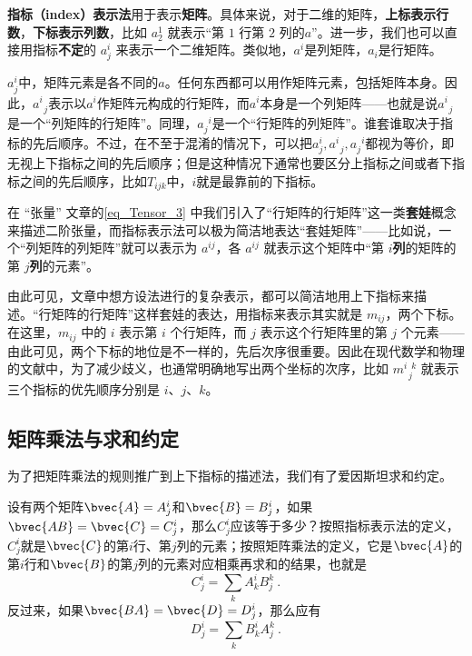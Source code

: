 \textbf{指标（index）表示法}用于表示\textbf{矩阵}。具体来说，对于二维的矩阵，\textbf{上标表示行数}，\textbf{下标表示列数}，比如 $a^1_2$ 就表示“第 $1$ 行第 $2$ 列的$a$”。进一步，我们也可以直接用指标\textbf{不定}的 $a^i_j$ 来表示一个二维矩阵。类似地，$a^i$是列矩阵，$a_i$是行矩阵。

$a^i_j$中，矩阵元素是各不同的$a$。任何东西都可以用作矩阵元素，包括矩阵本身。因此，$a^{i}_{\phantom{1}j}$表示以$a^i$作矩阵元构成的行矩阵，而$a^i$本身是一个列矩阵——也就是说$a^i_{\phantom{1}j}$是一个“列矩阵的行矩阵”。同理，$a^{\phantom{1}i}_j$是一个“行矩阵的列矩阵”。谁套谁取决于指标的先后顺序。不过，在不至于混淆的情况下，可以把$a^i_j, a^i_{\phantom{1}j}, a^{\phantom{1}i}_j$都视为等价，即无视上下指标之间的先后顺序；但是这种情况下通常也要区分上指标之间或者下指标之间的先后顺序，比如$T_{ijk}$中，$i$就是最靠前的下指标。

在 “张量” 文章的\autoref{eq_Tensor_3} 中我们引入了“行矩阵的行矩阵”这一类\textbf{套娃}概念来描述二阶张量，而指标表示法可以极为简洁地表达“套娃矩阵”——比如说，一个“列矩阵的列矩阵”就可以表示为 $a^{ij}$，各 $a^{ij}$ 就表示这个矩阵中“第 $i$\textbf{列}的矩阵的第 $j$\textbf{列}的元素”。

由此可见，文章中想方设法进行的复杂表示，都可以简洁地用上下指标来描述。“行矩阵的行矩阵”这样套娃的表达，用指标来表示其实就是 $m_{ij}$，两个下标。在这里，$m_{ij}$ 中的 $i$ 表示第 $i$ 个行矩阵，而 $j$ 表示这个行矩阵里的第 $j$ 个元素——由此可见，两个下标的地位是不一样的，先后次序很重要。因此在现代数学和物理的文献中，为了减少歧义，也通常明确地写出两个坐标的次序，比如 $m^{i\phantom{1}k}_{\phantom{1}j}$ 就表示三个指标的优先顺序分别是 $i$、$j$、$k$。




\subsection{矩阵乘法与求和约定}




为了把矩阵乘法的规则推广到上下指标的描述法，我们有了爱因斯坦求和约定。


设有两个矩阵$\bvec{A}=A^i_j$和$\bvec{B}=B^i_j$，如果$\bvec{AB}=\bvec{C}=C^i_j$，那么$C^i_j$应该等于多少？按照指标表示法的定义，$C^i_j$就是$\bvec{C}$的第$i$行、第$j$列的元素；按照矩阵乘法的定义，它是$\bvec{A}$的第$i$行和$\bvec{B}$的第$j$列的元素对应相乘再求和的结果，也就是
\begin{equation}
C^i_j = \sum_k A^i_k B^k_j~. 
\end{equation}
反过来，如果$\bvec{BA}=\bvec{D}=D^i_j$，那么应有
\begin{equation}
D^i_j = \sum_k B^i_k A^k_j~. 
\end{equation}


